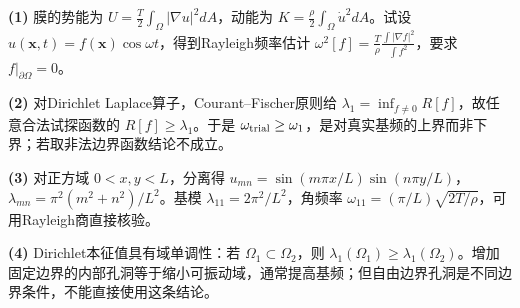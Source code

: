 \par\noindent\textbf{(1)} 膜的势能为 \(U=\frac T2\int_\Omega|\nabla u|^2dA\)，动能为 \(K=\frac\rho2\int_\Omega \dot u^2dA\)。试设 \(u(\boldsymbol x,t)=f(\boldsymbol x)\cos\omega t\)，得到Rayleigh频率估计 \(\omega^2[f]=\frac T\rho\frac{\int|\nabla f|^2}{\int f^2}\)，要求 \(f|_{\partial\Omega}=0\)。
\par\noindent\textbf{(2)} 对Dirichlet Laplace算子，Courant–Fischer原则给 \(\lambda_1=\inf_{f\ne0}R[f]\)，故任意合法试探函数的 \(R[f]\ge\lambda_1\)。于是 \(\omega_{\rm trial}\ge\omega_1\)，是对真实基频的上界而非下界；若取非法边界函数结论不成立。
\par\noindent\textbf{(3)} 对正方域 \(0<x,y<L\)，分离得 \(u_{mn}=\sin(m\pi x/L)\sin(n\pi y/L)\)，\(\lambda_{mn}=\pi^2(m^2+n^2)/L^2\)。基模 \(\lambda_{11}=2\pi^2/L^2\)，角频率 \(\omega_{11}=(\pi/L)\sqrt{2T/\rho}\)，可用Rayleigh商直接核验。
\par\noindent\textbf{(4)} Dirichlet本征值具有域单调性：若 \(\Omega_1\subset\Omega_2\)，则 \(\lambda_1(\Omega_1)\ge\lambda_1(\Omega_2)\)。增加固定边界的内部孔洞等于缩小可振动域，通常提高基频；但自由边界孔洞是不同边界条件，不能直接使用这条结论。
